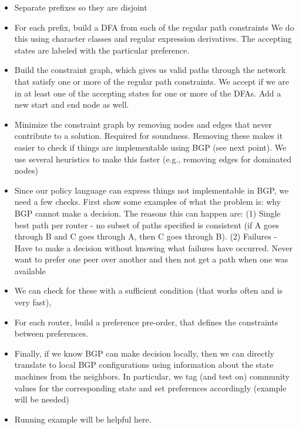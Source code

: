 \begin{itemize}
	\item Separate prefixes so they are disjoint
	
	\item For each prefix, build a DFA from each of the regular path constraints
		  We do this using character classes and regular expression derivatives.
		  The accepting states are labeled with the particular preference.
	
	\item Build the constraint graph, which gives us valid paths through the network that satisfy one or
		  more of the regular path constraints. We accept if we are in at least one of the accepting states
		  for one or more of the DFAs. Add a new start and end node as well.
		
	\item Minimize the constraint graph by removing nodes and edges that never contribute to a solution.
		  Required for soundness. Removing these makes it easier to check if things are implementable using BGP (see next point).
		  We use several heuristics to make this faster (e.g., removing edges for dominated nodes)
		
	\item Since our policy language can express things not implementable in BGP, we need a few checks.
		  First show some examples of what the problem is: why BGP cannot make a decision.
		  The reasons this can happen are:
		  (1) Single best path per router - no subset of paths specified is consistent (if A goes through B and C goes through A, then C goes through B).
		  (2) Failures - Have to make a decision without knowing what failures have occurred. Never want to prefer one peer over another and then not get a path when one was available

	\item We can check for these with a sufficient condition (that works often and is very fast),

	\item For each router, build a preference pre-order, that defines the constraints between preferences.
	
	\item Finally, if we know BGP can make decision locally, then we can directly translate to local BGP configurations using
		  information about the state machines from the neighbors. In particular, we tag (and test on) community values for the
		  corresponding state and set preferences accordingly (example will be needed)

	\item Running example will be helpful here.	
\end{itemize}



